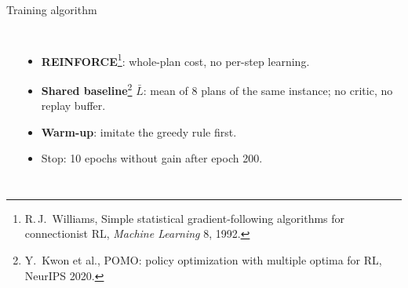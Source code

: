 \documentclass[aspectratio=169,11pt,t]{beamer}
\begin{document}
\begin{frame}{Training algorithm}
\begin{columns}[T]
\begin{algorithm}[H]
\caption{RL Training}
\end{algorithm}
\small
\begin{itemize}
  \item \textbf{REINFORCE}\footnote{R.\,J.~Williams, Simple statistical gradient-following algorithms for connectionist RL, \emph{Machine Learning} 8, 1992.}: whole-plan cost, no per-step learning.
  \item \textbf{Shared baseline}\footnote{Y.~Kwon et al., POMO: policy optimization with multiple optima for RL, NeurIPS 2020.} $\bar L$: mean of 8 plans of the same instance; no critic, no replay buffer.
  \item \textbf{Warm-up}: imitate the greedy rule first.
  \item Stop: 10 epochs without gain after epoch 200.
\end{itemize}
\end{columns}
\end{frame}
\end{document}
